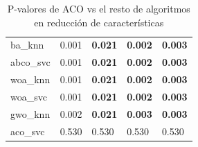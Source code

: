 \begin{table}[htb]
\begin{tabular}{lllll}
        ba\_knn    & 0.001     & \textbf{0.021} & \textbf{0.002} & \textbf{0.003} \\
        abco\_svc  & 0.001     & \textbf{0.021} & \textbf{0.002} & \textbf{0.003} \\
        woa\_knn   & 0.001     & \textbf{0.021} & \textbf{0.002} & \textbf{0.003} \\
        woa\_svc   & 0.001     & \textbf{0.021} & \textbf{0.002} & \textbf{0.003} \\
        gwo\_knn   & 0.002     & \textbf{0.021} & \textbf{0.003} & \textbf{0.003} \\
        aco\_svc   & 0.530     & 0.530          & 0.530          & 0.530          \\
        \bottomrule
    \end{tabular}
    \caption{P-valores de ACO vs el resto de algoritmos en reducción de características}
    \label{tab:p-values_aco_rest}
\end{table}



